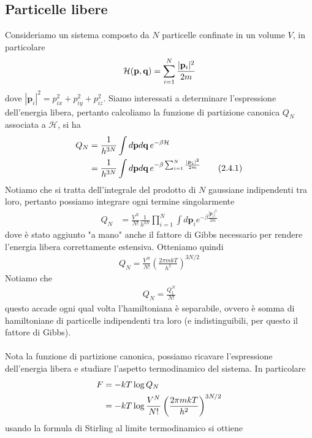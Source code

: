 \documentclass{article}
\begin{document}
\subsection{Particelle libere}
Consideriamo un sistema composto da $N$ particelle confinate in un volume $V$, in particolare 
\begin{align}
    \mathcal{H}(\mathbf{p}, \mathbf{q}) = \sum_{i = 1}^N \frac{|\mathbf{p}_i|^2}{2m} \notag
\end{align}
dove $|\mathbf{p}_i|^2 = p^2_{ix} + p^2_{iy} + p^2_{iz}$. Siamo interessati a determinare l'espressione dell'energia libera, pertanto calcoliamo la funzione di partizione canonica $Q_N$ associata a $\mathcal{H}$, si ha 
\begin{align}
    Q_N &= \frac{1}{h^{3N}}\int d\mathbf{p}d\mathbf{q} \, e^{-\beta\mathcal{H}} \notag \\
    &= \frac{1}{h^{3N}}\int d\mathbf{p}d\mathbf{q} \, e^{-\beta\sum_{i = 1}^N \frac{|\mathbf{p}_i|^2}{2m}} \tag{2.4.1}
\end{align}
Notiamo che si tratta dell'integrale del prodotto di $N$ gaussiane indipendenti tra loro, pertanto possiamo integrare ogni termine singolarmente
\begin{align}
    Q_N &= \frac{V^N}{N!}\frac{1}{h^{3N}}\prod_{i = 1}^N \int d\mathbf{p}_i e^{-\beta\frac{|\mathbf{p}_i|^2}{2m}} \tag{2.4.2}
\end{align}
dove è stato aggiunto "a mano" anche il fattore di Gibbs necessario per rendere l'energia libera correttamente estensiva. Otteniamo quindi 
\begin{align}
    Q_N = \frac{V^N}{N!}\left(\frac{2\pi mkT}{h^2}\right)^{3N/2} \tag{2.4.3}
\end{align}
Notiamo che 
\begin{align}
    Q_N = \frac{Q^N_1}{N!} \tag{2.4.4}
\end{align}
questo accade ogni qual volta l'hamiltoniana è separabile, ovvero è somma di hamiltoniane di particelle indipendenti tra loro (e indistinguibili, per questo il fattore di Gibbs). \\ \\
Nota la funzione di partizione canonica, possiamo ricavare l'espressione dell'energia libera e studiare l'aspetto termodinamico del sistema. In particolare 
\begin{align}
    F &= -kT\log Q_N \notag \\
    &= -kT\log \frac{V^N}{N!}\left(\frac{2\pi mkT}{h^2}\right)^{3N/2} \notag
\end{align}
usando la formula di Stirling al limite termodinamico si ottiene 
\end{document}
